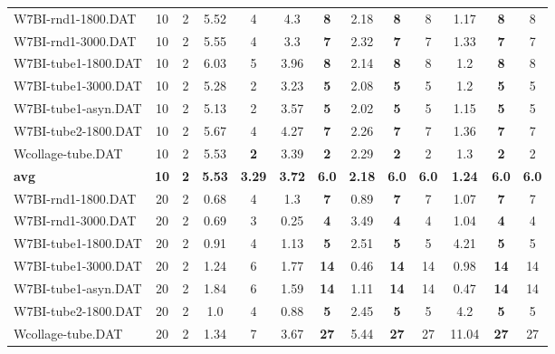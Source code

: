 \begin{table}[h]
{\begin{tabular}{lcccccccccccc}
W7BI-rnd1-1800.DAT & 10 & 2 & 5.52 & 4 & 4.3 &  \textbf{8} & 2.18 &  \textbf{8} & 8 &  \textcolor{blue2}{1.17} &  \textbf{8} & 8 \\
W7BI-rnd1-3000.DAT & 10 & 2 & 5.55 & 4 & 3.3 &  \textbf{7} & 2.32 &  \textbf{7} & 7 &  \textcolor{blue2}{1.33} &  \textbf{7} & 7 \\
W7BI-tube1-1800.DAT & 10 & 2 & 6.03 & 5 & 3.96 &  \textbf{8} & 2.14 &  \textbf{8} & 8 &  \textcolor{blue2}{1.2} &  \textbf{8} & 8 \\
W7BI-tube1-3000.DAT & 10 & 2 & 5.28 & 2 & 3.23 &  \textbf{5} & 2.08 &  \textbf{5} & 5 &  \textcolor{blue2}{1.2} &  \textbf{5} & 5 \\
W7BI-tube1-asyn.DAT & 10 & 2 & 5.13 & 2 & 3.57 &  \textbf{5} & 2.02 &  \textbf{5} & 5 &  \textcolor{blue2}{1.15} &  \textbf{5} & 5 \\
W7BI-tube2-1800.DAT & 10 & 2 & 5.67 & 4 & 4.27 &  \textbf{7} & 2.26 &  \textbf{7} & 7 &  \textcolor{blue2}{1.36} &  \textbf{7} & 7 \\
Wcollage-tube.DAT & 10 & 2 & 5.53 &  \textbf{2} & 3.39 &  \textbf{2} & 2.29 &  \textbf{2} & 2 &  \textcolor{blue2}{1.3} &  \textbf{2} & 2 \\
\cline{1-13} \textbf{avg} & \textbf{10} & \textbf{2} & \textbf{5.53} & \textbf{3.29} & \textbf{3.72} & \textbf{6.0} & \textbf{2.18} & \textbf{6.0} & \textbf{6.0} & \textbf{1.24} & \textbf{6.0} & \textbf{6.0} \\ \cline{1-13}
W7BI-rnd1-1800.DAT & 20 & 2 &  \textcolor{blue2}{0.68} & 4 & 1.3 &  \textbf{7} & 0.89 &  \textbf{7} & 7 & 1.07 &  \textbf{7} & 7 \\
W7BI-rnd1-3000.DAT & 20 & 2 & 0.69 & 3 &  \textcolor{blue2}{0.25} &  \textbf{4} & 3.49 &  \textbf{4} & 4 & 1.04 &  \textbf{4} & 4 \\
W7BI-tube1-1800.DAT & 20 & 2 &  \textcolor{blue2}{0.91} & 4 & 1.13 &  \textbf{5} & 2.51 &  \textbf{5} & 5 & 4.21 &  \textbf{5} & 5 \\
W7BI-tube1-3000.DAT & 20 & 2 & 1.24 & 6 & 1.77 &  \textbf{14} &  \textcolor{blue2}{0.46} &  \textbf{14} & 14 & 0.98 &  \textbf{14} & 14 \\
W7BI-tube1-asyn.DAT & 20 & 2 & 1.84 & 6 & 1.59 &  \textbf{14} & 1.11 &  \textbf{14} & 14 &  \textcolor{blue2}{0.47} &  \textbf{14} & 14 \\
W7BI-tube2-1800.DAT & 20 & 2 & 1.0 & 4 &  \textcolor{blue2}{0.88} &  \textbf{5} & 2.45 &  \textbf{5} & 5 & 4.2 &  \textbf{5} & 5 \\
Wcollage-tube.DAT & 20 & 2 &  \textcolor{blue2}{1.34} & 7 & 3.67 &  \textbf{27} & 5.44 &  \textbf{27} & 27 & 11.04 &  \textbf{27} & 27 \\

\end{tabular}}
\end{table}
